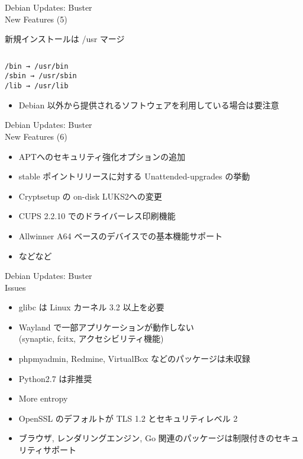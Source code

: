 \documentclass[cjk,c,squeeze,shrink,dvipdfmx,12pt]{beamer}
\begin{document}
\begin{frame}[fragile]{%
    Debian Updates: Buster%
    \\[-.5em]{\normalsize{New Features (5)}}
  }

  新規インストールは /usr マージ

\begin{verbatim}
\end{verbatim}
  \begin{center}
    {\Huge{
        \texttt{/bin → /usr/bin}\\
        \texttt{/sbin → /usr/sbin}\\
        \texttt{/lib → /usr/lib}\\
    }}
  \end{center}

  \begin{itemize}
  \item Debian 以外から提供されるソフトウェアを利用している場合は要注意
  \end{itemize}
\end{frame}

\begin{frame}[fragile]{%
    Debian Updates: Buster%
    \\[-.5em]{\normalsize{New Features (6)}}
  }
  \pause
  \begin{itemize}[<+->]
  \item APTへのセキュリティ強化オプションの追加
  \item stable ポイントリリースに対する Unattended-upgrades の挙動
  \item Cryptsetup の on-disk LUKS2への変更
  \item CUPS 2.2.10 でのドライバーレス印刷機能
  \item Allwinner A64 ベースのデバイスでの基本機能サポート
  \item などなど
  \end{itemize}
\end{frame}

\begin{frame}[fragile]{%
    Debian Updates: Buster%
    \\[-.5em]{\normalsize{Issues}}
  }
  \pause
  \begin{itemize}[<+->]
  \item glibc は Linux カーネル 3.2 以上を必要
  \item Wayland で一部アプリケーションが動作しない\\
    (synaptic, fcitx, アクセシビリティ機能)
  \item phpmyadmin, Redmine, VirtualBox などのパッケージは未収録
  \item Python2.7 は非推奨
  \item More entropy
  \item OpenSSL のデフォルトが TLS 1.2 とセキュリティレベル 2
  \item ブラウザ, レンダリングエンジン, Go 関連のパッケージは制限付きのセキュリティサポート
  \end{itemize}
\end{frame}
\end{document}
